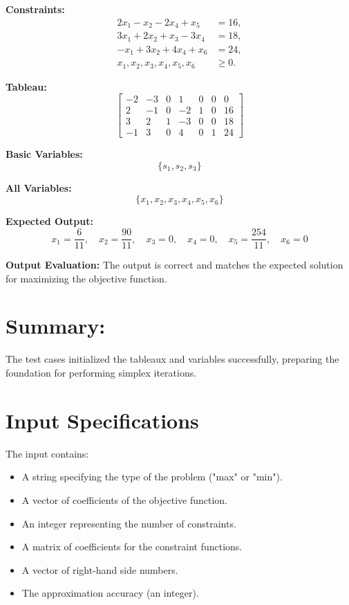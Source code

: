 \documentclass[12pt, legalpaper]{exam}
\begin{document}
\textbf{Constraints:}
\[
\begin{aligned}
2x_1 - x_2 - 2x_4 + x_5 &= 16, \\
3x_1 + 2x_2 + x_3 - 3x_4 &= 18, \\
-x_1 + 3x_2 + 4x_4 + x_6 &= 24, \\
x_1, x_2, x_3, x_4, x_5, x_6 &\geq 0.
\end{aligned}
\]

\textbf{Tableau:}
\[
\begin{bmatrix}
-2 & -3 & 0 & 1 & 0 & 0 & 0 \\
2 & -1 & 0 & -2 & 1 & 0 & 16 \\
3 & 2 & 1 & -3 & 0 & 0 & 18 \\
-1 & 3 & 0 & 4 & 0 & 1 & 24
\end{bmatrix}
\]

\textbf{Basic Variables:}
\[
\{ s_1, s_2, s_3 \}
\]

\textbf{All Variables:}
\[
\{ x_1, x_2, x_3, x_4, x_5, x_6 \}
\]

\textbf{Expected Output:}
\[
x_1 = \frac{6}{11}, \quad x_2 = \frac{90}{11}, \quad x_3 = 0, \quad x_4 = 0, \quad x_5 = \frac{254}{11}, \quad x_6 = 0
\]

\textbf{Output Evaluation:} The output is correct and matches the expected solution for maximizing the objective function.

\section*{Summary:}
The test cases initialized the tableaux and variables successfully, preparing the foundation for performing simplex iterations.
\vspace{12pt}

\section*{Input Specifications}
The input contains:
\begin{itemize}
    \item A string specifying the type of the problem ("max" or "min").
    \item A vector of coefficients of the objective function.
    \item An integer representing the number of constraints.
    \item A matrix of coefficients for the constraint functions.
    \item A vector of right-hand side numbers.
    \item The approximation accuracy (an integer).
\end{itemize}
\end{document}
